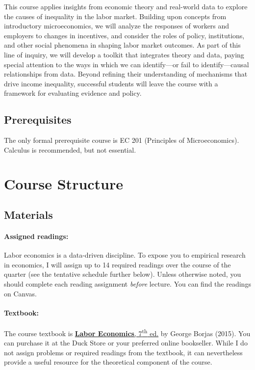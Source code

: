 \documentclass[11pt]{article}
\begin{document}
This course applies insights from economic theory and real-world data to explore the causes of inequality in the labor market. Building upon concepts from introductory microeconomics, we will analyze the responses of workers and employers to changes in incentives, and consider the roles of policy, institutions, and other social phenomena in shaping labor market outcomes. As part of this line of inquiry, we will develop a toolkit that integrates theory and data, paying special attention to the ways in which we can identify---or fail to identify---causal relationships from data. Beyond refining their understanding of mechanisms that drive income inequality, successful students will leave the course with a framework for evaluating evidence and policy.

\subsection*{Prerequisites} 

The only formal prerequisite course is EC 201 (Principles of Microeconomics). Calculus is recommended, but not essential.

\section*{Course Structure}

\subsection*{Materials} 

\paragraph*{Assigned readings:} Labor economics is a data-driven discipline. To expose you to empirical research in economics, I will assign up to 14 required readings over the course of the quarter (see the tentative schedule further below). Unless otherwise noted, you should complete each reading assignment \textit{before} lecture. You can find the readings on Canvas.

\paragraph*{Textbook:} The course textbook is \href{https://www.amazon.com/Labor-Economics-George-J-Borjas/dp/007802188X}{\textbf{Labor Economics}, 7\textsuperscript{th} ed.} by George Borjas (2015). You can purchase it at the Duck Store or your preferred online bookseller. While I do not assign problems or required readings from the textbook, it can nevertheless provide a useful resource for the theoretical component of the course.
\end{document}

